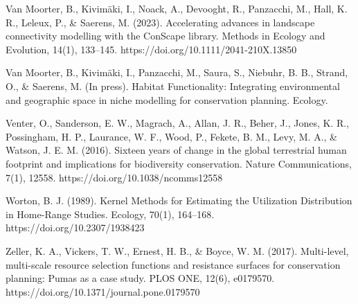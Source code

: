 \documentclass[titlepage]{article}
\begin{document}
Van Moorter, B., Kivimäki, I., Noack, A., Devooght, R., Panzacchi, M., Hall, K. R., Leleux, P., & Saerens, M. (2023). Accelerating advances in landscape connectivity modelling with the ConScape library. Methods in Ecology and Evolution, 14(1), 133–145. https://doi.org/10.1111/2041-210X.13850

Van Moorter, B., Kivimäki, I., Panzacchi, M., Saura, S., Niebuhr, B. B., Strand, O., & Saerens, M. (In press). Habitat Functionality: Integrating environmental and geographic space in niche modelling for conservation planning. Ecology.

Venter, O., Sanderson, E. W., Magrach, A., Allan, J. R., Beher, J., Jones, K. R., Possingham, H. P., Laurance, W. F., Wood, P., Fekete, B. M., Levy, M. A., & Watson, J. E. M. (2016). Sixteen years of change in the global terrestrial human footprint and implications for biodiversity conservation. Nature Communications, 7(1), 12558. https://doi.org/10.1038/ncomms12558

Worton, B. J. (1989). Kernel Methods for Estimating the Utilization Distribution in Home-Range Studies. Ecology, 70(1), 164–168. https://doi.org/10.2307/1938423

Zeller, K. A., Vickers, T. W., Ernest, H. B., & Boyce, W. M. (2017). Multi-level, multi-scale resource selection functions and resistance surfaces for conservation planning: Pumas as a case study. PLOS ONE, 12(6), e0179570. https://doi.org/10.1371/journal.pone.0179570
\end{document}
